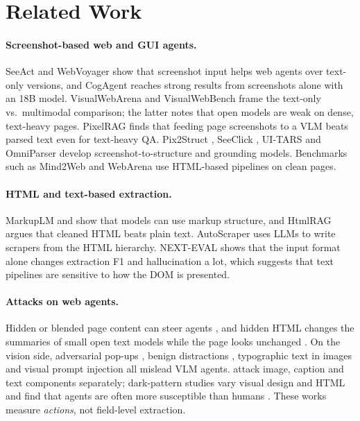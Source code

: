 \documentclass[letterpaper,10pt,twocolumn]{article}
\begin{document}
\section{Related Work}

\paragraph{Screenshot-based web and GUI agents.}
SeeAct \citep{zheng2024seeact} and WebVoyager \citep{he2024webvoyager} show
that screenshot input helps web agents over text-only versions, and CogAgent
\citep{hong2023cogagent} reaches strong results from screenshots alone with an
18B model. VisualWebArena \citep{koh2024visualwebarena} and VisualWebBench
\citep{liu2024visualwebbench} frame the text-only vs.\ multimodal comparison;
the latter notes that open models are weak on dense, text-heavy pages.
PixelRAG \citep{wang2026pixelrag} finds that feeding page screenshots to a VLM
beats parsed text even for text-heavy QA. Pix2Struct
\citep{lee2023pix2struct}, SeeClick \citep{cheng2024seeclick}, UI-TARS
\citep{qin2025uitars} and OmniParser \citep{lu2024omniparser} develop
screenshot-to-structure and grounding models. Benchmarks such as Mind2Web
\citep{deng2023mind2web} and WebArena \citep{zhou2023webarena} use HTML-based
pipelines on clean pages.

\paragraph{HTML and text-based extraction.}
MarkupLM \citep{li2022markuplm} and \citet{gur2023html} show that models can use
markup structure, and HtmlRAG \citep{tan2024htmlrag} argues that cleaned HTML
beats plain text. AutoScraper \citep{huang2024autoscraper} uses LLMs to write
scrapers from the HTML hierarchy. NEXT-EVAL \citep{kim2025nexteval} shows that
the input format alone changes extraction F1 and hallucination a lot, which
suggests that text pipelines are sensitive to how the DOM is presented.

\paragraph{Attacks on web agents.}
Hidden or blended page content can steer agents
\citep{greshake2023indirect,liao2024eia}, and hidden HTML changes the summaries
of small open text models while the page looks unchanged
\citep{verma2025htmlinjection}. On the vision side, adversarial pop-ups
\citep{zhang2024popups}, benign distractions \citep{ma2024caution}, typographic
text in images \citep{cheng2024typographic} and visual prompt injection
\citep{cao2026vpibench} all mislead VLM agents. \citet{wu2025dissecting} attack
image, caption and text components separately; dark-pattern studies vary visual
design and HTML and find that agents are often more susceptible than humans
\citep{ersoy2026darkpatterns,cuvin2025decepticon}. These works measure
\emph{actions}, not field-level extraction.
\end{document}
